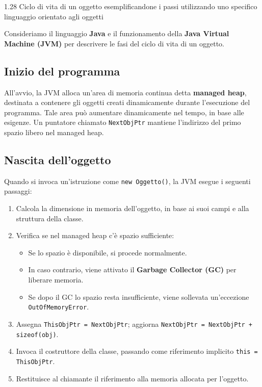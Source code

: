 \begin{problem}{1.28}
Ciclo di vita di un oggetto esemplificandone i passi utilizzando uno specifico linguaggio orientato agli oggetti
\end{problem}
\begin{solution}
Consideriamo il linguaggio \textbf{Java} e il funzionamento della \textbf{Java Virtual Machine (JVM)} per descrivere le 
fasi del ciclo di vita di un oggetto.

\subsection*{Inizio del programma}
All'avvio, la JVM alloca un'area di memoria continua detta \textbf{managed heap}, destinata a contenere gli oggetti creati 
dinamicamente durante l'esecuzione del programma. Tale area può aumentare dinamicamente nel tempo, in base alle esigenze.
Un puntatore chiamato \texttt{NextObjPtr} mantiene l'indirizzo del primo spazio libero nel managed heap.

\subsection*{Nascita dell’oggetto}
Quando si invoca un'istruzione come \texttt{new Oggetto()}, la JVM esegue i seguenti passaggi:

\begin{enumerate}
\item Calcola la dimensione in memoria dell’oggetto, in base ai suoi campi e alla struttura della classe.
\item Verifica se nel managed heap c’è spazio sufficiente:
\begin{itemize}
\item Se lo spazio è disponibile, si procede normalmente.
\item In caso contrario, viene attivato il \textbf{Garbage Collector (GC)} per liberare memoria.
\item Se dopo il GC lo spazio resta insufficiente, viene sollevata un’eccezione \texttt{OutOfMemoryError}.
\end{itemize}
\item Assegna \texttt{ThisObjPtr = NextObjPtr}; aggiorna \texttt{NextObjPtr = NextObjPtr + sizeof(obj)}.
\item Invoca il costruttore della classe, passando come riferimento implicito \texttt{this = ThisObjPtr}.
\item Restituisce al chiamante il riferimento alla memoria allocata per l’oggetto.
\end{enumerate}


\end{solution}
